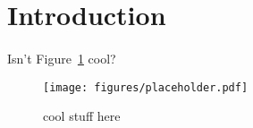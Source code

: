 \section{Introduction}
\label{sec:intro}

\paragraph{}
Isn't Figure~\ref{fig:placeholder} cool?

\begin{figure}[htb]
\centering
\texttt{[image: figures/placeholder.pdf]}
\caption{cool stuff here}
\label{fig:placeholder}
\end{figure}
